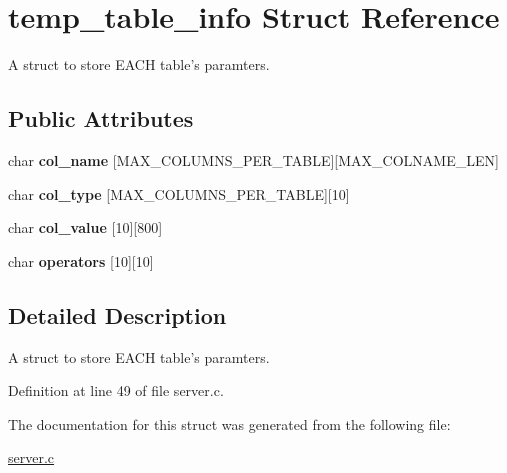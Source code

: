 \hypertarget{structtemp__table__info}{
\section{temp\_\-table\_\-info Struct Reference}
\label{structtemp__table__info}
}


A struct to store EACH table's paramters.  


\subsection*{Public Attributes}
\begin{DoxyCompactItemize}
\item 
\hypertarget{structtemp__table__info_a71993c377f65830aff189cba4fb945d2}{
char {\bfseries col\_\-name} \mbox{[}MAX\_\-COLUMNS\_\-PER\_\-TABLE\mbox{]}\mbox{[}MAX\_\-COLNAME\_\-LEN\mbox{]}}
\label{structtemp__table__info_a71993c377f65830aff189cba4fb945d2}

\item 
\hypertarget{structtemp__table__info_ac3cfd6feee96aea387a31119cabf33e0}{
char {\bfseries col\_\-type} \mbox{[}MAX\_\-COLUMNS\_\-PER\_\-TABLE\mbox{]}\mbox{[}10\mbox{]}}
\label{structtemp__table__info_ac3cfd6feee96aea387a31119cabf33e0}

\item 
\hypertarget{structtemp__table__info_a14a2032bc13db1b2dc12bf25872d3547}{
char {\bfseries col\_\-value} \mbox{[}10\mbox{]}\mbox{[}800\mbox{]}}
\label{structtemp__table__info_a14a2032bc13db1b2dc12bf25872d3547}

\item 
\hypertarget{structtemp__table__info_a090fd8fcfdf3a0a45e0dbe50d823c06e}{
char {\bfseries operators} \mbox{[}10\mbox{]}\mbox{[}10\mbox{]}}
\label{structtemp__table__info_a090fd8fcfdf3a0a45e0dbe50d823c06e}

\end{DoxyCompactItemize}


\subsection{Detailed Description}
A struct to store EACH table's paramters. 

Definition at line 49 of file server.c.



The documentation for this struct was generated from the following file:\begin{DoxyCompactItemize}
\item 
\hyperlink{server_8c}{server.c}\end{DoxyCompactItemize}
